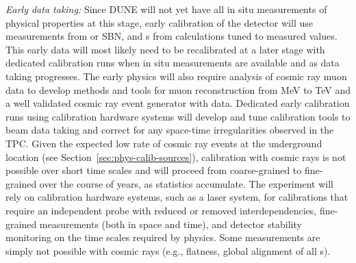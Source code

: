 \textit{Early data taking:} Since DUNE will not yet have all in situ measurements of \lar physical properties at this stage, early calibration of the detector will use \lar measurements from  or SBN, and \efield{}s from calculations tuned to measured  values.
This early data will most likely need to be recalibrated at a later stage with dedicated calibration runs when in situ measurements are available and as data taking progresses.
The early physics will also require analysis of cosmic ray muon data to develop methods and tools for muon reconstruction from MeV to TeV and a well validated cosmic ray event generator with data. 
Dedicated early calibration runs using calibration hardware systems will develop and tune calibration tools to beam data taking and correct for any space-time irregularities observed in the TPC. Given the expected low rate of cosmic ray events at the underground location (see Section~\ref{sec:phys-calib-sources}), calibration with cosmic rays is not possible over short time scales and will proceed from coarse-grained to fine-grained over the course of years, as statistics accumulate. 
The experiment will rely on calibration hardware systems, such as a laser system, for calibrations that require an independent probe with reduced or removed interdependencies, fine-grained measurements (both in space and time), and detector stability monitoring on the time scales required by physics. Some measurements are simply not possible with cosmic rays (e.g.,  flatness, global alignment of all s). %

